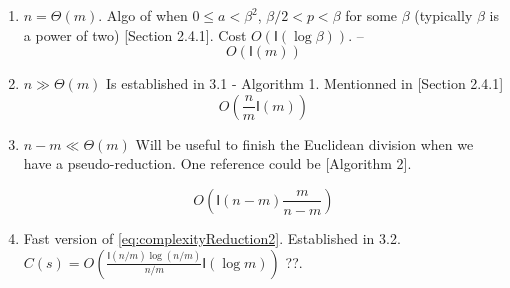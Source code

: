 \documentclass[acmtoms]{acmsmall}
\def\I{\mathsf{I}}
\begin{document}
\begin{enumerate}
  \item $n = \Theta (m)$.  Algo of \cite{Barrett86,Montgomery85} when $0 \le a < \beta^2$, $ \beta/2 < p < \beta$ for some $\beta$ (typically $\beta$ is a power of two) \cite{BrZi10}[Section 2.4.1]. Cost $O(\I(\log \beta))$.
    -- 
    \begin{equation}\label{eq:complexityReduction1} 
      O \left( \I (m) \right)
    \end{equation}
  
  \item $n \gg \Theta (m)$ Is established in 3.1 - Algorithm 1. Mentionned in \cite{BrZi10}[Section 2.4.1]
    \begin{equation}\label{eq:complexityReduction2} 
      O \left( \frac{n}{m} \I(m) \right)
    \end{equation}
  
  \item $n-m \ll \Theta (m)$ Will be useful to finish the Euclidean division when we have a pseudo-reduction. One reference could be \cite{GII13}[Algorithm 2].
  
  \begin{equation}\label{eq:complexityReduction3} 
    O \left( \I (n-m) \frac{m}{n-m} \right)
  \end{equation}

  \item Fast version of \ref{eq:complexityReduction2}. Established in 3.2. $C(s) = O( \frac{\I(n/m) \log (n/m)}{n/m} \I(\log m))$ ??.
\end{enumerate}



\end{document}
